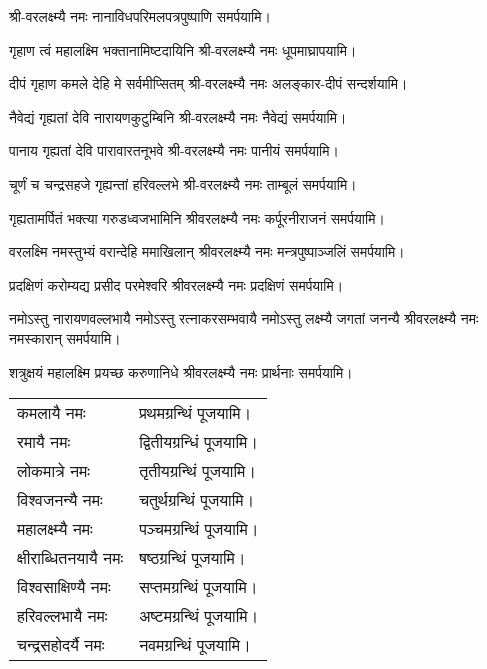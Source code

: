 \begingroup
\centering
\setlength{\columnseprule}{1pt}
\let\chapt\sect


\endgroup

श्री-वरलक्ष्म्यै नमः नानाविध\-परिमल\-पत्रपुष्पाणि समर्पयामि।

\begin{center}
{गृहाण त्वं महालक्ष्मि भक्तानामिष्टदायिनि}
श्री-वरलक्ष्म्यै नमः धूपमाघ्रापयामि।\medskip

{दीपं गृहाण कमले देहि मे सर्वमीप्सितम्}
श्री-वरलक्ष्म्यै नमः अलङ्कार-दीपं सन्दर्शयामि। \medskip

{नैवेद्यं गृह्यतां देवि नारायणकुटुम्बिनि} 
श्री-वरलक्ष्म्यै नमः नैवेद्यं समर्पयामि। \medskip

{पानाय गृह्यतां देवि पारावारतनूभवे} 
श्री-वरलक्ष्म्यै नमः पानीयं समर्पयामि। \medskip


{चूर्णं च चन्द्रसहजे गृह्यन्तां हरिवल्लभे}
श्री-वरलक्ष्म्यै नमः ताम्बूलं समर्पयामि। \medskip


{गृह्यतामर्पितं भक्त्या गरुडध्वजभामिनि}
श्रीवरलक्ष्म्यै नमः कर्पूरनीराजनं समर्पयामि।\medskip

{वरलक्ष्मि नमस्तुभ्यं वरान्देहि ममाखिलान्}
श्रीवरलक्ष्म्यै नमः मन्त्रपुष्पाञ्जलिं समर्पयामि।\medskip

{प्रदक्षिणं करोम्यद्य प्रसीद परमेश्वरि}
श्रीवरलक्ष्म्यै नमः प्रदक्षिणं समर्पयामि।\medskip

{नमोऽस्तु नारायणवल्लभायै }
{नमोऽस्तु रत्नाकरसम्भवायै} 
{नमोऽस्तु लक्ष्म्यै जगतां जनन्यै} 
श्रीवरलक्ष्म्यै नमः नमस्कारान् समर्पयामि।\medskip

{शत्रुक्षयं महालक्ष्मि प्रयच्छ करुणानिधे}
श्रीवरलक्ष्म्यै नमः प्रार्थनाः समर्पयामि।\medskip


\begin{longtable}{l@{— }l}
कमलायै नमः & प्रथमग्रन्थिं पूजयामि।\\
रमायै नमः & द्वितीयग्रन्धिं पूजयामि।\\
लोकमात्रे नमः & तृतीयग्रन्थिं पूजयामि।\\
विश्वजनन्यै नमः & चतुर्थग्रन्थिं पूजयामि।\\
महालक्ष्म्यै नमः & पञ्चमग्रन्थिं पूजयामि।\\
क्षीराब्धितनयायै नमः & षष्ठग्रन्थिं पूजयामि।\\
विश्वसाक्षिण्यै नमः & सप्तमग्रन्थिं पूजयामि।\\
हरिवल्लभायै नमः & अष्टमग्रन्थिं पूजयामि।\\
चन्द्रसहोदर्यै नमः & नवमग्रन्थिं पूजयामि।\\
\end{longtable}


\end{center}
